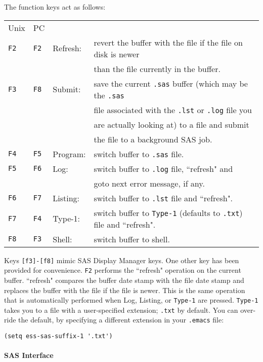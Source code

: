 \documentclass{article}
\begin{document}
The function keys act as follows:\\
\begin{tabular}{llll}
Unix& PC&\\
\tt F2  &\tt  F2& Refresh:&revert the buffer with the file if the file on disk is newer\\
\tt     &\tt    &         &       than the file currently in the buffer.\\
\tt F3  &\tt  F8& Submit: &save   the current {\tt .sas} buffer (which may be the {\tt .sas}\\
\tt     &\tt    &         &       file associated with the {\tt .lst} or {\tt .log} file you\\
\tt     &\tt    &         &       are actually looking at) to a file and submit\\
\tt     &\tt    &         &       the file to a background SAS job.\\
\tt F4  &\tt  F5& Program:&switch buffer to {\tt .sas} file.\\
\tt F5  &\tt  F6& Log:    &switch buffer to {\tt .log} file, ``refresh" and \\
\tt     &\tt    &         &        goto next error message, if any.\\
\tt F6  &\tt  F7& Listing:&switch buffer to {\tt .lst} file and ``refresh".\\
\tt F7  &\tt  F4& Type-1: &switch buffer to {\tt Type-1} (defaults to {\tt .txt}) file and ``refresh".\\
\tt F8  &\tt  F3& Shell:  &switch buffer to shell.\\
\end{tabular}


Keys {\tt [f3]-[f8]} mimic SAS Display Manager keys.  One other key has been
provided for convenience.  {\tt F2} performs the ``refresh" operation on the
current buffer.  ``refresh" compares the buffer date stamp with the
file date stamp and replaces the buffer with the file if the file is
newer.  This is the same operation that is automatically performed
when Log, Listing, or {\tt Type-1} are pressed.  {\tt Type-1} takes you to a file
with a user-specified extension; {\tt .txt} by default.  You can over-ride
the default, by specifying a different extension in your {\tt .emacs} file:
\begin{verbatim}
(setq ess-sas-suffix-1 '.txt')
\end{verbatim}

\paragraph{SAS Interface}
\label{sec:SAS:interface}
\end{document}
